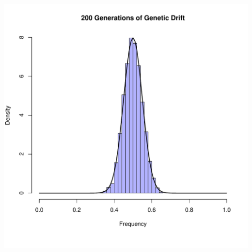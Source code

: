 \documentclass{beamer}
\begin{document}
\begin{frame}
\begin{columns}
\begin{column}{0.45\textwidth}
			\includegraphics[width = 1.5 \textwidth]{../figs/Hist200gens.pdf}
					
		\end{column}
	\end{columns}
\end{frame}
\end{document}
